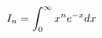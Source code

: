\documentclass[preview]{standalone}
\begin{document}
\begin{align*}
\special{dvisvgm:raw <g id='unique000'>}I_n=\displaystyle\int_0^{\infty}x^ne^{-x}dx\special{dvisvgm:raw </g>}
\end{align*}
\end{document}
